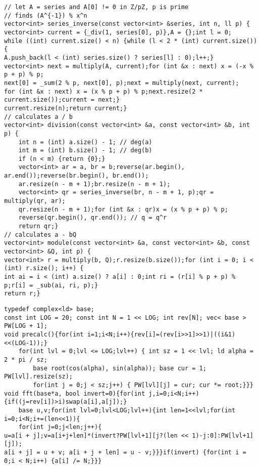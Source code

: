 \documentclass[a4paper,12pt]{article}
\begin{document}
\begin{verbatim}
// let A = series and A[0] != 0 in Z/pZ, p is prime
// finds (A^{-1}) % x^n
vector<int> series_inverse(const vector<int> &series, int n, ll p) {
vector<int> current = {_div(1, series[0], p)},A = {};int l = 0;
while ((int) current.size() < n) {while (l < 2 * (int) current.size()) {
A.push_back(l < (int) series.size() ? series[l] : 0);l++;}
vector<int> next = multiply(A, current);for (int &x : next) x = (-x % p + p) % p;
next[0] = _sum(2 % p, next[0], p);next = multiply(next, current);
for (int &x : next) x = (x % p + p) % p;next.resize(2 * current.size());current = next;}
current.resize(n);return current;}
// calculates a / b
vector<int> division(const vector<int> &a, const vector<int> &b, int p) {
    int n = (int) a.size() - 1; // deg(a)
    int m = (int) b.size() - 1; // deg(b)
    if (n < m) {return {0};}
    vector<int> ar = a, br = b;reverse(ar.begin(), ar.end());reverse(br.begin(), br.end());
    ar.resize(n - m + 1);br.resize(n - m + 1);
    vector<int> qr = series_inverse(br, n - m + 1, p);qr = multiply(qr, ar);
    qr.resize(n - m + 1);for (int &x : qr)x = (x % p + p) % p;
    reverse(qr.begin(), qr.end()); // q = q^r
    return qr;}
// calculates a - bQ
vector<int> module(const vector<int> &a, const vector<int> &b, const vector<int> &Q, int p) {
vector<int> r = multiply(b, Q);r.resize(b.size());for (int i = 0; i < (int) r.size(); i++) {
int ai = i < (int) a.size() ? a[i] : 0;int ri = (r[i] % p + p) % p;r[i] = _sub(ai, ri, p);}
return r;}
\end{verbatim}

\begin{verbatim}
typedef complex<ld> base;
const int LOG = 20; const int N = 1 << LOG; int rev[N]; vec< base > PW[LOG + 1];
void precalc(){for(int i=1;i<N;i++){rev[i]=(rev[i>>1]>>1)|((i&1)<<(LOG-1));}
    for(int lvl = 0;lvl <= LOG;lvl++) { int sz = 1 << lvl; ld alpha = 2 * pi / sz;
        base root(cos(alpha), sin(alpha)); base cur = 1; PW[lvl].resize(sz);
        for(int j = 0;j < sz;j++) { PW[lvl][j] = cur; cur *= root;}}}
void fft(base*a, bool invert=0){for(int j,i=0;i<N;i++){if((j=rev[i])>i)swap(a[i],a[j]);}
    base u,v;for(int lvl=0;lvl<LOG;lvl++){int len=1<<lvl;for(int i=0;i<N;i+=(len<<1)){
    for(int j=0;j<len;j++){
u=a[i + j];v=a[i+j+len]*(invert?PW[lvl+1][j?(len << 1)-j:0]:PW[lvl+1][j]);
a[i + j] = u + v; a[i + j + len] = u - v;}}}if(invert) {for(int i = 0;i < N;i++) {a[i] /= N;}}}
\end{verbatim}
\end{document}
